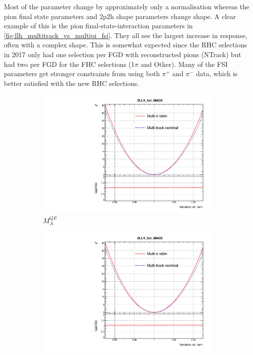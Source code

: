 Most of the parameter change by approximately only a normalisation whereas the pion final state parameters and 2p2h shape parameters change shape. A clear example of this is the pion final-state-interaction parameters in \autoref{fig:llh_multitrack_vs_multipi_fsi}. They all see the largest increase in response, often with a complex shape. This is somewhat expected since the RHC selections in 2017 only had one selection per FGD with reconstructed pions (NTrack) but had two per FGD for the FHC selections (1$\pi$ and Other). Many of the FSI parameters get stronger constraints from using both $\pi^+$ and $\pi^-$ data, which is better satisfied with the new RHC selections.
\begin{figure}[h]
	\centering
	\begin{subfigure}[t]{0.32\textwidth}
		\includegraphics[width=\textwidth,page=1, trim={0mm 0mm 0mm 9mm}, clip]{figures/mach3/2018/llh/MultiPi_vs_MultiTrack_TotalLLH}
		\caption{$M_A^{QE}$}
	\end{subfigure}
	\begin{subfigure}[t]{0.32\textwidth}
		\includegraphics[width=\textwidth,page=4, trim={0mm 0mm 0mm 9mm}, clip]{figures/mach3/2018/llh/MultiPi_vs_MultiTrack_TotalLLH}

\end{subfigure}
\end{figure}
